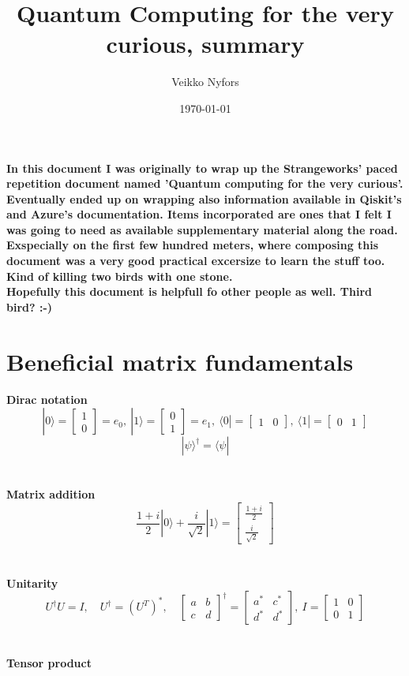 \documentclass[11pt, fleqn]{article}
\title{Quantum Computing for the very curious, summary}
\author{Veikko Nyfors}
\date{\today}
\begin{document}
\maketitle

\paragraph{In this document I was originally to wrap up the Strangeworks' paced repetition document named 'Quantum computing for the very curious'.
Eventually ended up on wrapping also information available in Qiskit's and Azure's documentation.
Items incorporated are ones that I felt I was going to need as available supplementary material along the road.
Exspecially on the first few hundred meters, where composing this document was a very good practical excersize to learn the stuff too.
Kind of killing two birds with one stone.
\\
Hopefully this document is helpfull fo other people as well. Third bird? :-)
}


\newpage

\section{Beneficial matrix fundamentals}

\bf{Dirac notation}
\[|0\rangle=\begin{bmatrix} 1\\0\end{bmatrix}=e_0,\:
|1\rangle=\begin{bmatrix} 0\\1\end{bmatrix}=e_1,\:
\langle0|=\begin{bmatrix} 1&0\end{bmatrix},\:\langle1|=\begin{bmatrix} 0&1\end{bmatrix}\]
\[|\psi\rangle^\dagger=\langle\psi|\]
\\~\\
\bf{Matrix addition}
\[\frac{1+i}{2}|0\rangle + \frac{i}{\sqrt{2}}|1\rangle = \begin{bmatrix} \frac{1+i}{2}\\\frac{i}{\sqrt{2}} \end{bmatrix}\]
\\~\\
\bf{Unitarity}
\[U^\dagger U=I,\quad U^\dagger=(U^T)^*,\quad
\begin{bmatrix}a & b\\c & d\end{bmatrix}^\dagger=\begin{bmatrix}a^* & c^*\\d^* & d^*\end{bmatrix},\:I=\begin{bmatrix}1&0\\0&1\end{bmatrix}\]
\\~\\
\bf{Tensor product\\}
\end{document}
